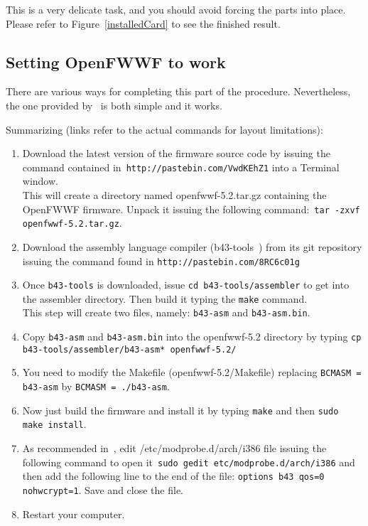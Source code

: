 \documentclass[conference]{IEEEtran}
\begin{document}
This is a very delicate task, and you should avoid forcing the parts into place. Please refer to Figure~\ref{installedCard} to see the finished result.

\subsection{Setting OpenFWWF to work}
There are various ways for completing this part of the procedure. Nevertheless, the one provided by~\cite{gnewsense} is both simple and it works.

Summarizing (links refer to the actual commands for layout limitations):
\begin{enumerate}
	\item Download the latest version of the firmware source code by issuing the command contained in~\texttt{http://pastebin.com/VwdKEhZ1} into a Terminal window. \\ This will create a directory named  openfwwf-5.2.tar.gz containing the OpenFWWF firmware. Unpack it issuing the following command:~\texttt{tar -zxvf openfwwf-5.2.tar.gz}.
	\item Download the assembly language compiler (b43-tools~\cite{b43-tools}) from its git repository issuing the command found in \texttt{http://pastebin.com/8RC6c01g}
	\item Once \texttt{b43-tools} is downloaded, issue \texttt{cd b43-tools/assembler} to get into the assembler directory. Then build it typing the \texttt{make} command.\\ This step will create two files, namely: \texttt{b43-asm} and \texttt{b43-asm.bin}.
	\item Copy \texttt{b43-asm} and \texttt{b43-asm.bin} into the openfwwf-5.2 directory by typing \texttt{cp b43-tools/assembler/b43-asm* openfwwf-5.2/}
	\item You need to modify the Makefile (openfwwf-5.2/Makefile) replacing \texttt{BCMASM = b43-asm} by \texttt{BCMASM = ./b43-asm}.
	\item Now just build the firmware and install it by typing \texttt{make} and then \texttt{sudo make install}.\label{make}
	\item As recommended in~\cite{OpenFWWF}, edit /etc/modprobe.d/arch/i386 file issuing the following command to open it~\texttt{sudo gedit etc/modprobe.d/arch/i386} and then add the following line to the end of the file: \texttt{options b43 qos=0 nohwcrypt=1}. Save and close the file.
	\item Restart your computer.
\end{enumerate}
\end{document}
